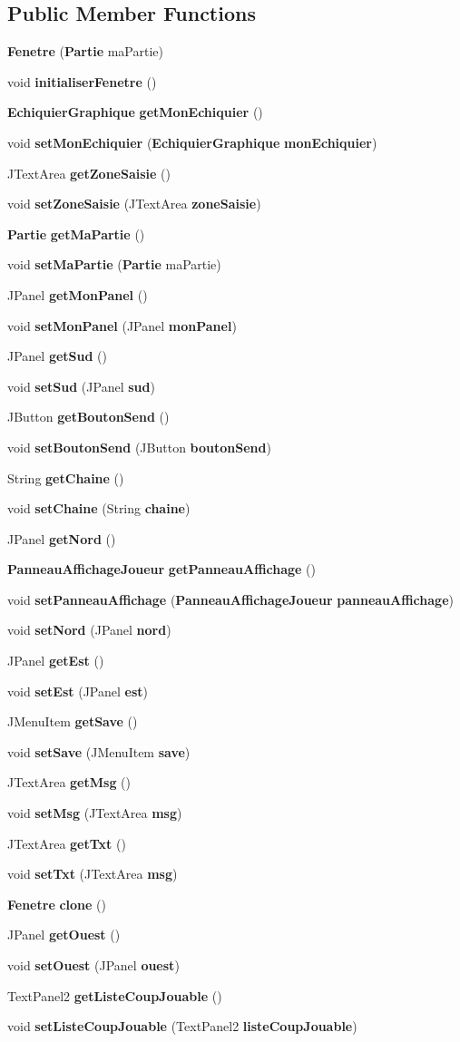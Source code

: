 \subsection*{Public Member Functions}
\begin{DoxyCompactItemize}
\item 
{\bf Fenetre} ({\bf Partie} ma\-Partie)
\item 
void {\bf initialiser\-Fenetre} ()
\item 
{\bf Echiquier\-Graphique} {\bf get\-Mon\-Echiquier} ()
\item 
void {\bf set\-Mon\-Echiquier} ({\bf Echiquier\-Graphique} {\bf mon\-Echiquier})
\item 
J\-Text\-Area {\bf get\-Zone\-Saisie} ()
\item 
void {\bf set\-Zone\-Saisie} (J\-Text\-Area {\bf zone\-Saisie})
\item 
{\bf Partie} {\bf get\-Ma\-Partie} ()
\item 
void {\bf set\-Ma\-Partie} ({\bf Partie} ma\-Partie)
\item 
J\-Panel {\bf get\-Mon\-Panel} ()
\item 
void {\bf set\-Mon\-Panel} (J\-Panel {\bf mon\-Panel})
\item 
J\-Panel {\bf get\-Sud} ()
\item 
void {\bf set\-Sud} (J\-Panel {\bf sud})
\item 
J\-Button {\bf get\-Bouton\-Send} ()
\item 
void {\bf set\-Bouton\-Send} (J\-Button {\bf bouton\-Send})
\item 
String {\bf get\-Chaine} ()
\item 
void {\bf set\-Chaine} (String {\bf chaine})
\item 
J\-Panel {\bf get\-Nord} ()
\item 
{\bf Panneau\-Affichage\-Joueur} {\bf get\-Panneau\-Affichage} ()
\item 
void {\bf set\-Panneau\-Affichage} ({\bf Panneau\-Affichage\-Joueur} {\bf panneau\-Affichage})
\item 
void {\bf set\-Nord} (J\-Panel {\bf nord})
\item 
J\-Panel {\bf get\-Est} ()
\item 
void {\bf set\-Est} (J\-Panel {\bf est})
\item 
J\-Menu\-Item {\bf get\-Save} ()
\item 
void {\bf set\-Save} (J\-Menu\-Item {\bf save})
\item 
J\-Text\-Area {\bf get\-Msg} ()
\item 
void {\bf set\-Msg} (J\-Text\-Area {\bf msg})
\item 
J\-Text\-Area {\bf get\-Txt} ()
\item 
void {\bf set\-Txt} (J\-Text\-Area {\bf msg})
\item 
{\bf Fenetre} {\bf clone} ()
\item 
J\-Panel {\bf get\-Ouest} ()
\item 
void {\bf set\-Ouest} (J\-Panel {\bf ouest})
\item 
Text\-Panel2 {\bf get\-Liste\-Coup\-Jouable} ()
\item 
void {\bf set\-Liste\-Coup\-Jouable} (Text\-Panel2 {\bf liste\-Coup\-Jouable})
\end{DoxyCompactItemize}
